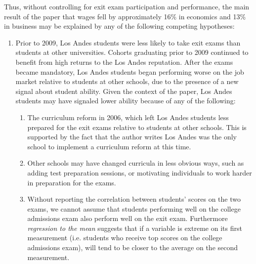 \documentclass[a4paper, 11pt]{article}
\begin{document}
Thus, without controlling for exit exam participation and performance, the main result of the paper that wages fell by approximately 16\% in economics and 13\% in business may be explained by any of the following competing hypotheses: 
\begin{enumerate}
\item Prior to 2009, Los Andes students were less likely to take exit exams than students at other universities.  Cohorts graduating prior to 2009 continued to benefit from high returns to the Los Andes reputation.  After the exams became mandatory, Los Andes students began performing worse on the job market relative to students at other schools, due to the presence of a new signal about student ability.  Given the context of the paper, Los Andes students may have signaled lower ability because of any of the following:
\begin{enumerate}
\item The curriculum reform in 2006, which left Los Andes students less prepared for the exit exams relative to students at other schools.  This is supported by the fact that the author writes Los Andes was the only school to implement a curriculum reform at this time.
\item Other schools may have changed curricula in less obvious ways, such as adding test preparation sessions, or motivating individuals to work harder in preparation for the exams.  \item Without reporting the correlation between students' scores on the two exams, we cannot assume that students performing well on the college admissions exam also perform well on the exit exam.  Furthermore \textit{regression to the mean} suggests that if a variable is extreme on its first measurement (i.e. students who receive top scores on the college admissions exam), will tend to be closer to the average on the second measurement.  

\end{enumerate}


\end{enumerate}
\end{document}
